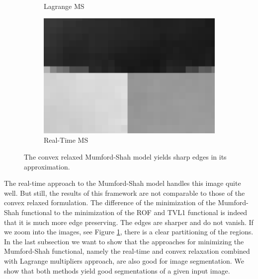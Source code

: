 \documentclass[abstracton]{scrreprt}
\begin{document}
\begin{figure}[!ht]
\begin{subfigure}[b]{0.24\textwidth}
                    \caption{Lagrange MS}
                \end{subfigure}
                \begin{subfigure}[b]{0.24\textwidth}
                    \includegraphics[width=\textwidth]{img/zoomed/gauss_noise_rt_zoomed.png}
                    \caption{Real-Time MS}
                \end{subfigure}
                \caption[Gauss denoising comparison of several models with zooming into images.]{The convex relaxed Mumford-Shah model yields sharp edges in its approximation.}
            \label{fig:synth_gauss_compare_zoomed}
            \end{figure}
            The real-time approach to the Mumford-Shah model handles this image quite well. But still, the results of this framework are not comparable to those of the convex relaxed formulation. The difference of the minimization of the Mumford-Shah functional to the minimization of the ROF and TVL1 functional is indeed that it is much more edge preserving. The edges are sharper and do not vanish. If we zoom into the images, see Figure \ref{fig:synth_gauss_compare_zoomed}, there is a clear partitioning of the regions. In the last subsection we want to show that the approaches for minimizing the Mumford-Shah functional, namely the real-time and convex relaxation combined with Lagrange multipliers approach, are also good for image segmentation. We show that both methods yield good segmentations of a given input image.
\end{document}
